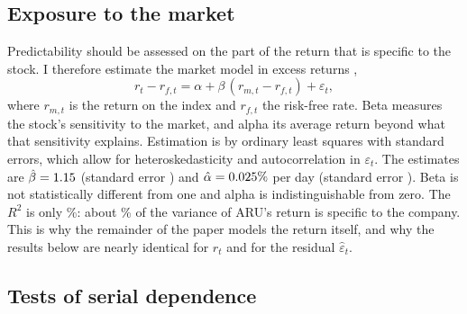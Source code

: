 \documentclass[11pt,a4paper]{article}
\begin{document}
\subsection{Exposure to the market}

Predictability should be assessed on the part of the return that is specific to the stock. I therefore estimate the market model in excess returns \citep{sharpe1964},
\begin{equation}\label{eq:mm}
r_t-r_{f,t}=\alpha+\beta\,(r_{m,t}-r_{f,t})+\varepsilon_t ,
\end{equation}
where $r_{m,t}$ is the return on the index and $r_{f,t}$ the risk-free rate. Beta measures the stock's sensitivity to the market, and alpha its average return beyond what that sensitivity explains. Estimation is by ordinary least squares with \citet{neweywest1987} standard errors, which allow for heteroskedasticity and autocorrelation in $\varepsilon_t$. The estimates are $\hat\beta=1.15$ (standard error \capmBetaSE) and $\hat\alpha=0.025\%$ per day (standard error \capmAlphaSE). Beta is not statistically different from one and alpha is indistinguishable from zero. The $R^2$ is only \capmRsq\%: about \capmIdio\% of the variance of ARU's return is specific to the company. This is why the remainder of the paper models the return itself, and why the results below are nearly identical for $r_t$ and for the residual $\hat\varepsilon_t$.

\subsection{Tests of serial dependence}
\end{document}
